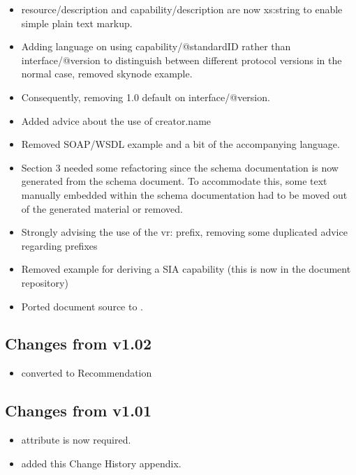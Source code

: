 \documentclass[11pt,a4paper]{ivoa}
\begin{document}
\begin{itemize}
\item resource/description and capability/description are now xs:string
to enable simple plain text markup.

\item Adding language on using capability/@standardID rather than
interface/@version to distinguish between different protocol versions in
the normal case, removed skynode example.

\item Consequently, removing 1.0 default on interface/@version.

\item Added advice about the use of creator.name

\item Removed SOAP/WSDL example and a bit of the accompanying language.

\item Section 3 needed some refactoring since the schema documentation
is now generated from the schema document.  To accommodate this, some
text manually embedded within the schema documentation had to be moved
out of the generated material or removed.

\item Strongly advising the use of the vr: prefix, removing some
duplicated advice regarding prefixes

\item Removed example for deriving a SIA capability (this is now
in the document repository)

\item Ported document source to \ivoatex.
\end{itemize}

\subsection{Changes from v1.02}
\begin{itemize}
  \item converted to Recommendation
\end{itemize}

\subsection{Changes from v1.01}
\begin{itemize}
  \item {} attribute is now required.
  \item added this Change History appendix.
\end{itemize}
\end{document}
